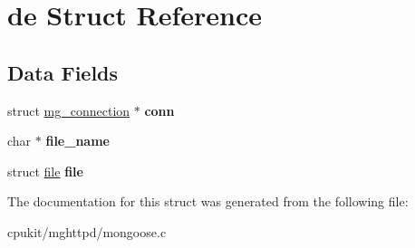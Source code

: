 \hypertarget{structde}{}\section{de Struct Reference}
\label{structde}
\subsection*{Data Fields}
\begin{DoxyCompactItemize}
\item 
\mbox{\label{structde_a6ac99b3d18410e75b174bd2840190aae}} 
struct \mbox{\hyperlink{structmg__connection}{mg\+\_\+connection}} $\ast$ {\bfseries conn}
\item 
\mbox{\label{structde_a08f58ddfc5471054734d921fc199b7ed}} 
char $\ast$ {\bfseries file\+\_\+name}
\item 
\mbox{\label{structde_a710caea3fe7f05a5cce3c5b5f39ea110}} 
struct \mbox{\hyperlink{structfile}{file}} {\bfseries file}
\end{DoxyCompactItemize}


The documentation for this struct was generated from the following file\+:\begin{DoxyCompactItemize}
\item 
cpukit/mghttpd/mongoose.\+c\end{DoxyCompactItemize}
